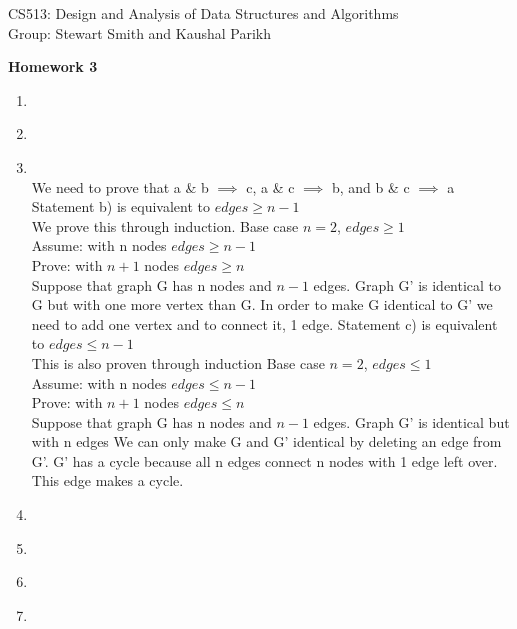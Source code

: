\documentclass[11pt]{article}
\begin{document}

\noindent CS513: Design and Analysis of Data Structures and Algorithms \\
        Group: Stewart Smith and Kaushal Parikh\\

        \begin{center}
        \LARGE{\textbf{Homework 3}}\\
            \end{center}

            \vspace{.1in}


            \begin{enumerate}

            \item \\
            \item
            \item \\
            We need to prove that a \& b $\implies$ c, a \& c $\implies$ b, and b \& c $\implies$ a\\
            \newline
            Statement b) is equivalent to $edges\geq n-1$\\
            We prove this through induction.  Base case $n=2$, $edges\geq1$\\
            Assume: with n nodes $edges\geq n-1$\\
            Prove: with $n+1$ nodes $edges\geq n$\\
            Suppose that graph G has n nodes and $n-1$ edges.  Graph G' is identical to G but with
            one more vertex than G.  In order to make G identical to G' we need to add one vertex and
            to connect it, 1 edge.
            \newline
            \newline
            Statement c) is equivalent to $edges\leq n-1$\\
            This is also proven through induction
            Base case $n=2$, $edges\leq1$\\
            Assume: with n nodes $edges\leq n-1$\\
            Prove: with $n+1$ nodes $edges\leq n$\\
            Suppose that graph G has n nodes and $n-1$ edges.  Graph G' is identical but with n edges
            We can only make G and G' identical by deleting an edge from G'.  G' has a cycle because all
            n edges connect n nodes with 1 edge left over.  This edge makes a cycle.
            \item \\
            \item \\
            \item \\
            \item \\
            
            \end{enumerate}

                                
\end{document}
